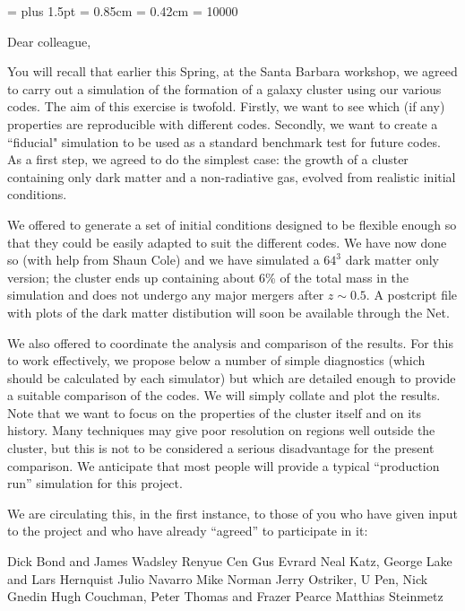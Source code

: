 \magnification=
\baselineskip 12pt
\parskip 8pt plus 1.5pt
\parindent=0pt
\bigskipamount = 0.85cm
\medskipamount = 0.42cm
\raggedbottom
\tolerance = 10000
\def\Mo{${\rm M_\odot}$}
\def\1item{\hangindent=1.0truecm \hangafter=1 \noindent}
\def\2item{\hangindent=2.0truecm \hangafter=1 \noindent}
\def\3item{\hangindent=3.0truecm \hangafter=1 \noindent}

Dear colleague,

You will recall that earlier this Spring, at the Santa Barbara
workshop, we agreed to carry out a simulation of the formation of a galaxy
cluster using our various codes. The aim of this exercise is
twofold. Firstly, we want to see which (if any) properties are reproducible
with different codes. Secondly, we want to create a ``fiducial" simulation
to be used as a standard benchmark test for future codes. As a first step,
we agreed to do the simplest case: the growth of a cluster containing only 
dark matter and a non-radiative gas, evolved from realistic initial
conditions.

We offered to generate a set of initial conditions designed to be flexible
enough so that they could be easily adapted to suit the different codes. We
have now done so (with help from Shaun Cole) and we have simulated a $64^3$
dark matter only version; the cluster ends up containing about 6\% of the
total mass in the simulation and does not undergo any major mergers after
$z\sim 0.5$. A postcript file with plots of the dark matter distibution
will soon be available through the Net.

We also offered to coordinate the analysis and comparison of the
results. For this to work effectively, we propose below a number of simple
diagnostics (which should be calculated by each simulator) but which are
detailed enough to provide a suitable comparison of the codes. We will
simply collate and plot the results. Note that we want to focus on the
properties of the cluster itself and on its history. Many techniques may
give poor resolution on regions well outside the cluster, but this is not
to be considered a serious disadvantage for the present comparison. We
anticipate that most people will provide a typical ``production run''
simulation for this project. 

We are circulating this, in the first instance, to those of you who have
given input to the project and who have already ``agreed'' to participate
in it: 

Dick Bond and James Wadsley \hfill\break 
Renyue Cen \hfill\break
Gus Evrard \hfill\break
Neal Katz, George Lake and Lars Hernquist \hfill\break
Julio Navarro \hfill\break
Mike Norman \hfill\break
Jerry Ostriker, U Pen, Nick Gnedin \hfill\break
Hugh Couchman, Peter Thomas and Frazer Pearce \hfill\break
Matthias Steinmetz \hfill\break


